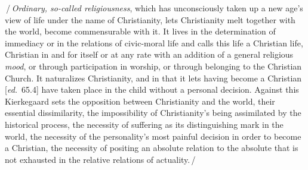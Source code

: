 \documentclass[12pt,a4paper,openany]{book}
\newcommand{\kpage}[1]{\marginnote{\footnotesize\textit{[#1]}}}
\newcommand{\ed}[1]{{\small[\textit{ed.}\ #1]}}
\newcommand{\ins}[1]{\,/\,#1\,/\,}
\begin{document}
\ins{\emph{Ordinary, so-called religiousness}, which has unconsciously taken up
a new age's view of life under the name of Christianity, lets
Christianity melt together with the world, become commensurable
with it. It lives in the determination of immediacy or
in the relations of civic-moral life and calls this life a Christian
life, Christian in and for itself or at any rate with an addition
of a general religious \emph{mood}, or through participation in worship,
or through belonging to the Christian Church. It naturalizes
Christianity, and in that it lets having become a Christian
\ed{65.4} have taken place in the child without a personal decision. Against this
Kierkegaard sets the opposition between Christianity
and the world, their essential dissimilarity, the impossibility of
Christianity's being assimilated by the historical process,
the necessity of suffering as its distinguishing mark in the world,
the necessity of the personality's most painful decision in order
\kpage{99}to become a Christian, the necessity of positing an absolute relation
to the absolute that is not exhausted in the relative relations
of actuality.}
\end{document}
